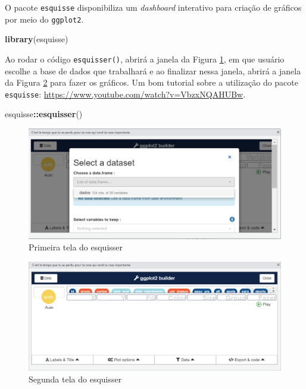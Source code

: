 \documentclass[
]{book}
\newenvironment{Shaded}{\begin{snugshade}}{\end{snugshade}}
\newcommand{\KeywordTok}[1]{\textcolor[rgb]{0.13,0.29,0.53}{\textbf{#1}}}
\newcommand{\NormalTok}[1]{#1}
\newcommand{\OperatorTok}[1]{\textcolor[rgb]{0.81,0.36,0.00}{\textbf{#1}}}
\begin{document}
O pacote \texttt{esquisse} disponibiliza um \emph{dashboard} interativo para criação de gráficos por meio do \texttt{ggplot2}.

\begin{Shaded}
\begin{Highlighting}[]
\KeywordTok{library}\NormalTok{(esquisse)}
\end{Highlighting}
\end{Shaded}

Ao rodar o código \texttt{esquisser()}, abrirá a janela da Figura \ref{fig:esquisse1}, em que usuário escolhe a base de dados que trabalhará e ao finalizar nessa janela, abrirá a janela da Figura \ref{fig:esquisse2} para fazer os gráficos. Um bom tutorial sobre a utilização do pacote \texttt{esquisse}: \url{https://www.youtube.com/watch?v=VbzxNQAHUBw}.

\begin{Shaded}
\begin{Highlighting}[]
\NormalTok{esquisse}\OperatorTok{::}\KeywordTok{esquisser}\NormalTok{() }
\end{Highlighting}
\end{Shaded}

\begin{figure}
\includegraphics[width=1\linewidth]{figures/esquise1} \caption{Primeira tela do esquisser}\label{fig:esquisse1}
\end{figure}

\begin{figure}
\includegraphics[width=1\linewidth]{figures/esquise2} \caption{Segunda tela do esquisser}\label{fig:esquisse2}
\end{figure}
\end{document}
